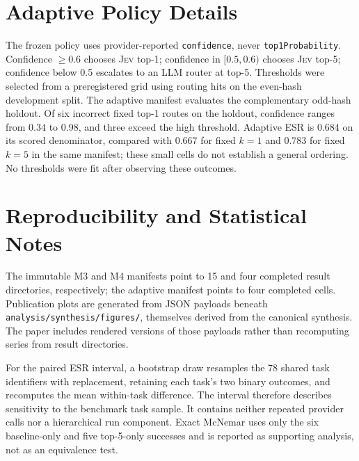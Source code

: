 \documentclass[10pt,twocolumn]{article}
\newcommand{\jev}{\textsc{Jev}}
\begin{document}
\section{Adaptive Policy Details}

The frozen policy uses provider-reported \texttt{confidence}, never \texttt{top1Probability}. Confidence $\geq0.6$ chooses \jev{} top-1; confidence in $[0.5,0.6)$ chooses \jev{} top-5; confidence below 0.5 escalates to an LLM router at top-5. Thresholds were selected from a preregistered grid using routing hits on the even-hash development split. The adaptive manifest evaluates the complementary odd-hash holdout. Of six incorrect fixed top-1 routes on the holdout, confidence ranges from 0.34 to 0.98, and three exceed the high threshold. Adaptive ESR is 0.684 on its scored denominator, compared with 0.667 for fixed $k=1$ and 0.783 for fixed $k=5$ in the same manifest; these small cells do not establish a general ordering. No thresholds were fit after observing these outcomes.

\section{Reproducibility and Statistical Notes}

The immutable M3 and M4 manifests point to 15 and four completed result directories, respectively; the adaptive manifest points to four completed cells. Publication plots are generated from JSON payloads beneath \texttt{analysis/synthesis/figures/}, themselves derived from the canonical synthesis. The paper includes rendered versions of those payloads rather than recomputing series from result directories.

For the paired ESR interval, a bootstrap draw resamples the 78 shared task identifiers with replacement, retaining each task's two binary outcomes, and recomputes the mean within-task difference. The interval therefore describes sensitivity to the benchmark task sample. It contains neither repeated provider calls nor a hierarchical run component. Exact McNemar uses only the six baseline-only and five top-5-only successes and is reported as supporting analysis, not as an equivalence test.
\end{document}
